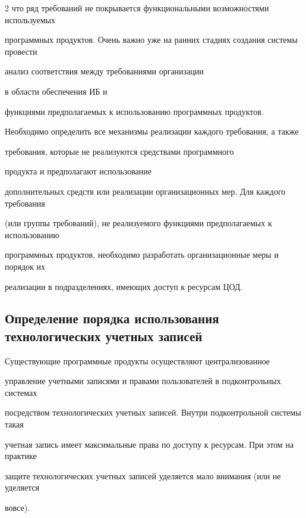 \begin{multicols}{2}
что ряд требований не покрывается функциональными возможностями используемых 


программных продуктов. Очень важно уже на ранних стадиях создания сис\-те\-мы провести 


анализ соответствия между требованиями организации


в области обеспечения ИБ и 


функциями предполагаемых к использованию программных продуктов.\linebreak 


Необходимо  определить все механизмы реализации каждого требования, а также 


требования, ко\-торые  не реализуются средствами программного\linebreak


продукта и  предполагают использование 


дополнительных средств или реализации организационных мер. Для каждого требования 


(или группы требований), не реализуемого функциями предполагаемых к использованию 


программных продуктов, необходимо разработать организационные меры и порядок их 


реализации в подразделениях, имеющих доступ к ресурсам ЦОД. 





\subsection{Определение порядка использования технологических учетных записей}





       Существующие программные продукты осуществляют централизованное 


управление учетными записями и правами пользователей в подконтрольных сис\-те\-мах 


посредством технологических учетных записей. Внутри подконтрольной сис\-те\-мы такая 


учетная запись имеет максимальные права по доступу к ресурсам. При этом на практике 


защите технологических учетных записей уделяется мало внимания (или не уделяется 


вовсе).


       



\end{multicols}
